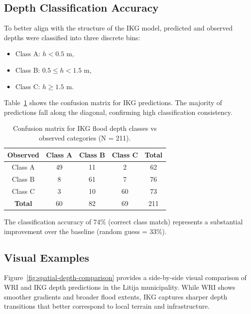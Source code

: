 \subsection{Depth Classification Accuracy}

To better align with the structure of the IKG model, predicted and observed depths were classified into three discrete bins:
\begin{itemize}
    \item Class A: $h < 0.5$ m,
    \item Class B: $0.5 \leq h < 1.5$ m,
    \item Class C: $h \geq 1.5$ m.
\end{itemize}

Table~\ref{tab:confusion-matrix-ikg} shows the confusion matrix for IKG predictions. The majority of predictions fall along the diagonal, confirming high classification consistency.

\begin{table}[htb]
    \centering
    \caption{Confusion matrix for IKG flood depth classes vs observed categories (N = 211).}
    \label{tab:confusion-matrix-ikg}
    \begin{tabular}{|c|c|c|c|c|}
        \hline
        \textbf{Observed} & \textbf{Class A} & \textbf{Class B} & \textbf{Class C} & \textbf{Total} \\
        \hline
        Class A & 49 & 11 & 2 & 62 \\
        Class B & 8 & 61 & 7 & 76 \\
        Class C & 3 & 10 & 60 & 73 \\
        \hline
        \textbf{Total} & 60 & 82 & 69 & 211 \\
        \hline
    \end{tabular}
\end{table}

The classification accuracy of 74\% (correct class match) represents a substantial improvement over the baseline (random guess = 33\%).

\subsection{Visual Examples}

Figure~\ref{fig:spatial-depth-comparison} provides a side-by-side visual comparison of WRI and IKG depth predictions in the Litija municipality. While WRI shows smoother gradients and broader flood extents, IKG captures sharper depth transitions that better correspond to local terrain and infrastructure.

